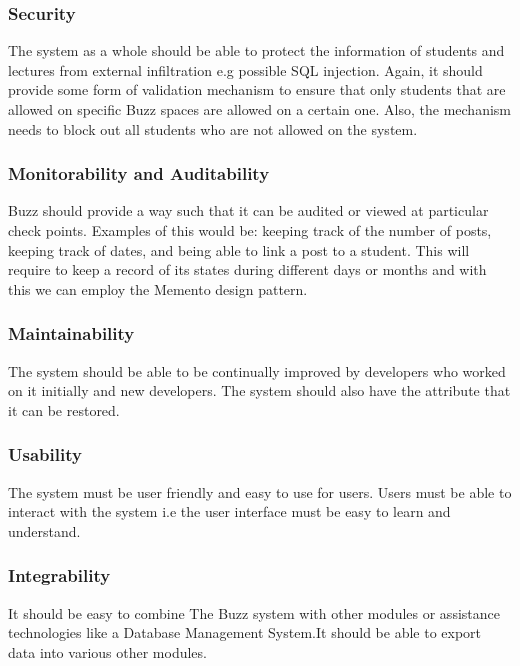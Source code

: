 \documentclass[10pt]{article}
\begin{document}
\subsubsection{Security}

The system as a whole should be able to protect the information of students and lectures from external infiltration e.g possible SQL injection. Again, it should provide some form of validation mechanism to ensure that only students that are allowed on specific Buzz spaces are allowed on a certain one. Also, the mechanism needs to block out all students who are not allowed on the system.

\subsubsection{Monitorability and Auditability}

Buzz should provide a way such that it can be audited or viewed at particular check points. Examples of this would be: keeping track of the number
of posts, keeping track of dates, and being able to link a post to a student. This will require to keep a record of its states during different days or months and with this we can employ the Memento design pattern.

\subsubsection{Maintainability}

The system should be able to be continually improved by developers who worked on it initially and new developers.
The system should also have the attribute that it can be restored.

\subsubsection{Usability}

The system must be user friendly and easy to use for users. Users must be able to interact with the system i.e the user interface must be easy to learn and understand.

\subsubsection{Integrability}

It should be easy to combine The Buzz system with other modules or assistance technologies like a Database Management System.It should be able to export data into various other modules.
\end{document}
